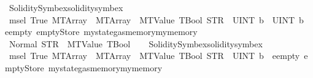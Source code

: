 \begin{isabellebody}
%
\isadelimproof
%
\endisadelimproof
%
\isatagproof
{}\isamarkupfalse%
\ Solidity{\isacharunderscore}{\kern0pt}Symbex{\isachardot}{\kern0pt}solidity{\isacharunderscore}{\kern0pt}symbex%
\endisatagproof
{\isafoldproof}%
%
\isadelimproof
\isanewline
%
\endisadelimproof
\isanewline
{}\isamarkupfalse%
\ {\isachardoublequoteopen}msel\ True\ {\isacharparenleft}{\kern0pt}MTArray\ {}\ {\isacharparenleft}{\kern0pt}MTArray\ {}\ {\isacharparenleft}{\kern0pt}MTValue\ TBool{\isacharparenright}{\kern0pt}{\isacharparenright}{\kern0pt}{\isacharparenright}{\kern0pt}\ {\isacharparenleft}{\kern0pt}STR\ {\isacharprime}{\kern0pt}{\isacharprime}{\kern0pt}{}{\isacharprime}{\kern0pt}{\isacharprime}{\kern0pt}{\isacharparenright}{\kern0pt}\ {\isacharbrackleft}{\kern0pt}UINT\ b{}\ {}{\isacharcomma}{\kern0pt}\ UINT\ b{}\ {}{\isacharbrackright}{\kern0pt}\ eempty\ emptyStore\ {\isacharparenleft}{\kern0pt}mystate{\isasymlparr}gas{\isacharcolon}{\kern0pt}{\isacharequal}{\kern0pt}{}{\isacharcomma}{\kern0pt}memory{\isacharcolon}{\kern0pt}{\isacharequal}{\kern0pt}mymemory{}{\isasymrparr}{\isacharparenright}{\kern0pt}\ {}\isanewline
{\isacharequal}{\kern0pt}\ Normal\ {\isacharparenleft}{\kern0pt}{\isacharparenleft}{\kern0pt}STR\ {\isacharprime}{\kern0pt}{\isacharprime}{\kern0pt}{}{\isachardot}{\kern0pt}{}{\isacharprime}{\kern0pt}{\isacharprime}{\kern0pt}{\isacharcomma}{\kern0pt}\ MTValue\ TBool{\isacharparenright}{\kern0pt}{\isacharcomma}{\kern0pt}\ {}{\isacharparenright}{\kern0pt}{\isachardoublequoteclose}%
\isadelimproof
\ %
\endisadelimproof
%
\isatagproof
{}\isamarkupfalse%
\ Solidity{\isacharunderscore}{\kern0pt}Symbex{\isachardot}{\kern0pt}solidity{\isacharunderscore}{\kern0pt}symbex%
\endisatagproof
{\isafoldproof}%
%
\isadelimproof
%
\endisadelimproof
\isanewline
\isanewline
{}\isamarkupfalse%
\ {\isachardoublequoteopen}msel\ True\ {\isacharparenleft}{\kern0pt}MTArray\ {}\ {\isacharparenleft}{\kern0pt}MTArray\ {}\ {\isacharparenleft}{\kern0pt}MTValue\ TBool{\isacharparenright}{\kern0pt}{\isacharparenright}{\kern0pt}{\isacharparenright}{\kern0pt}\ {\isacharparenleft}{\kern0pt}STR\ {\isacharprime}{\kern0pt}{\isacharprime}{\kern0pt}{}{\isacharprime}{\kern0pt}{\isacharprime}{\kern0pt}{\isacharparenright}{\kern0pt}\ {\isacharbrackleft}{\kern0pt}UINT\ b{}\ {}{\isacharbrackright}{\kern0pt}\ eempty\ emptyStore\ {\isacharparenleft}{\kern0pt}mystate{\isasymlparr}gas{\isacharcolon}{\kern0pt}{\isacharequal}{\kern0pt}{}{\isacharcomma}{\kern0pt}memory{\isacharcolon}{\kern0pt}{\isacharequal}{\kern0pt}mymemory{}{\isasymrparr}{\isacharparenright}{\kern0pt}\ {}\isanewline

\end{isabellebody}
